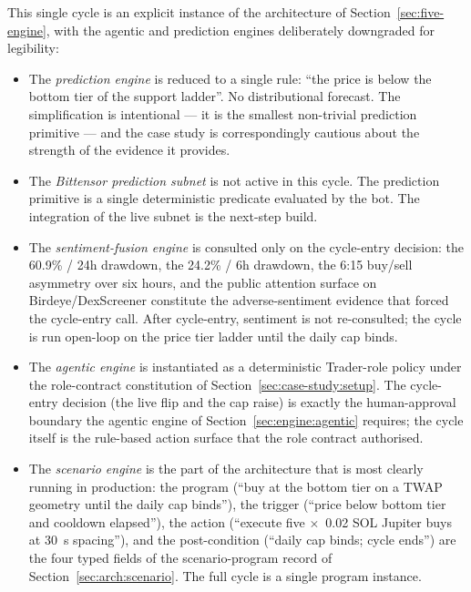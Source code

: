 \documentclass[11pt,a4paper]{article}
\begin{document}
This single cycle is an explicit instance of the architecture of
Section~\ref{sec:five-engine}, with the agentic and prediction engines
deliberately downgraded for legibility:
\begin{itemize}
  \item The \emph{prediction engine} is reduced to a single rule: ``the price is
        below the bottom tier of the support ladder''. No distributional forecast.
        The simplification is intentional --- it is the smallest non-trivial
        prediction primitive --- and the case study is correspondingly cautious about
        the strength of the evidence it provides.
  \item The \emph{Bittensor prediction subnet} is not active in this cycle. The
        prediction primitive is a single deterministic predicate evaluated by the
        bot. The integration of the live subnet is the next-step build.
  \item The \emph{sentiment-fusion engine} is consulted only on the cycle-entry
        decision: the 60.9\% / 24h drawdown, the 24.2\% / 6h drawdown, the 6:15
        buy/sell asymmetry over six hours, and the public attention surface on
        Birdeye/DexScreener constitute the adverse-sentiment evidence that forced
        the cycle-entry call. After cycle-entry, sentiment is not re-consulted; the
        cycle is run open-loop on the price tier ladder until the daily cap binds.
  \item The \emph{agentic engine} is instantiated as a deterministic Trader-role
        policy under the role-contract constitution of
        Section~\ref{sec:case-study:setup}. The cycle-entry decision (the live
        flip and the cap raise) is exactly the human-approval boundary the agentic
        engine of Section~\ref{sec:engine:agentic} requires; the cycle itself is
        the rule-based action surface that the role contract authorised.
  \item The \emph{scenario engine} is the part of the architecture that is most
        clearly running in production: the program (``buy at the bottom tier on a
        TWAP geometry until the daily cap binds''), the trigger (``price below
        bottom tier and cooldown elapsed''), the action (``execute five
        $\times$~0.02 SOL Jupiter buys at 30~s spacing''), and the post-condition
        (``daily cap binds; cycle ends'') are the four typed fields of the
        scenario-program record of Section~\ref{sec:arch:scenario}. The full
        cycle is a single program instance.
\end{itemize}
\end{document}
